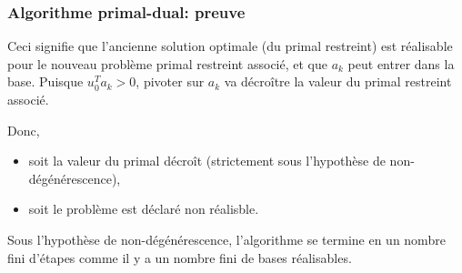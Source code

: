 \documentclass[t, aspectratio=169, usepdftitle=false]{beamer}
\begin{document}
\begin{frame}
\frametitle{Algorithme primal-dual: preuve}

Ceci signifie que l'ancienne solution optimale (du primal restreint) est réalisable pour le nouveau problème primal restreint associé, et que $a_k$ peut entrer dans la base.
Puisque $u_0^T a_k > 0$, pivoter sur $a_k$ va décroître la valeur du primal restreint associé.

\mbox{}

Donc,
\begin{itemize}
\item
soit la valeur du primal décroît (strictement sous l'hypothèse de non-dégénérescence),
\item
soit le problème est déclaré non réalisble.
\end{itemize}

\mbox{}

Sous l'hypothèse de non-dégénérescence, l'algorithme se termine en un nombre fini d'étapes comme il y a un nombre fini de bases réalisables.

\end{frame}
\end{document}
